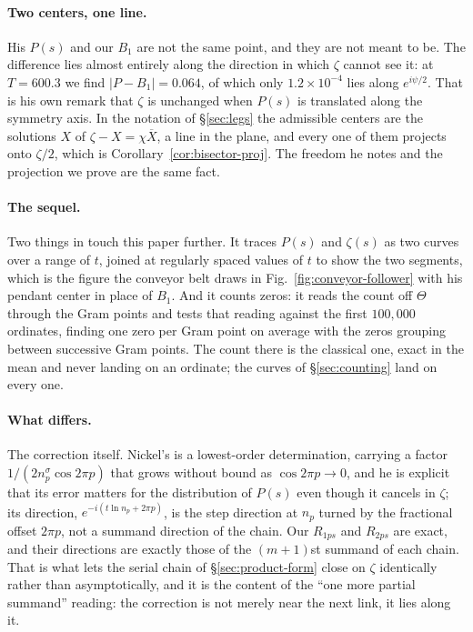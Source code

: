 \documentclass[11pt]{article}
\theoremstyle{definition}
\begin{document}
\paragraph{Two centers, one line.} His $P(s)$ and our $B_1$ are not the same
point, and they are not meant to be. The difference lies almost entirely
along the direction in which $\zeta$ cannot see it: at $T=600.3$ we find
$|P-B_1|=0.064$, of which only $1.2\times10^{-4}$ lies along $e^{i\psi/2}$.
That is his own remark that $\zeta$ is unchanged when $P(s)$ is translated
along the symmetry axis. In the notation of \S\ref{sec:legs} the
admissible centers are the solutions $X$ of $\zeta-X=\chi\overline{X}$, a
line in the plane, and every one of them projects onto $\zeta/2$, which is
Corollary~\ref{cor:bisector-proj}. The freedom he notes and the projection we
prove are the same fact.

\paragraph{The sequel.} Two things in \cite{Nickel2015} touch this paper
further. It traces $P(s)$ and $\zeta(s)$ as two curves over a range of $t$,
joined at regularly spaced values of $t$ to show the two segments, which is the
figure the conveyor belt draws in Fig.~\ref{fig:conveyor-follower} with his
pendant center in place of $B_1$. And it counts zeros: it reads the count off
$\Theta$ through the Gram points and tests that reading against the first
$100{,}000$ ordinates, finding one zero per Gram point on average with the zeros
grouping between successive Gram points. The count there is the classical one,
exact in the mean and never landing on an ordinate; the curves of
\S\ref{sec:counting} land on every one.

\paragraph{What differs.} The correction itself. Nickel's is a lowest-order
determination, carrying a factor $1/(2n_p^{\sigma}\cos 2\pi p)$ that grows
without bound as $\cos2\pi p\to0$, and he is explicit that its error matters
for the distribution of $P(s)$ even though it cancels in $\zeta$; its
direction, $e^{-i(t\ln n_p+2\pi p)}$, is the step direction at $n_p$ turned
by the fractional offset $2\pi p$, not a summand direction of the chain. Our
$R_{1ps}$ and $R_{2ps}$ are exact, and their directions are exactly those of
the $(m+1)$st summand of each chain. That is what lets the serial chain of
\S\ref{sec:product-form} close on $\zeta$ identically rather than
asymptotically, and it is the content of the ``one more partial summand''
reading: the correction is not merely near the next link, it lies along it.
\end{document}
